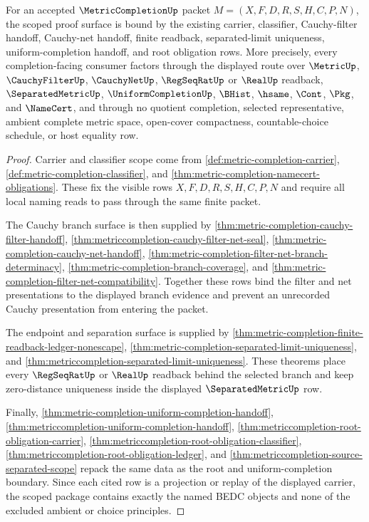 \begin{theorem}\label{thm:metriccompletion-scoped-dependency-package}
For an accepted $\MetricCompletionUp$ packet $M=(X,F,D,R,S,H,C,P,N)$, the scoped proof surface is bound by the existing carrier, classifier, Cauchy-filter handoff, Cauchy-net handoff, finite readback, separated-limit uniqueness, uniform-completion handoff, and root obligation rows. More precisely, every completion-facing consumer factors through the displayed route over $\MetricUp$, $\CauchyFilterUp$, $\CauchyNetUp$, $\RegSeqRatUp$ or $\RealUp$ readback, $\SeparatedMetricUp$, $\UniformCompletionUp$, $\BHist$, $\hsame$, $\Cont$, $\Pkg$, and $\NameCert$, and through no quotient completion, selected representative, ambient complete metric space, open-cover compactness, countable-choice schedule, or host equality row.
\end{theorem}
\begin{proof}
Carrier and classifier scope come from \autoref{def:metric-completion-carrier}, \autoref{def:metric-completion-classifier}, and \autoref{thm:metric-completion-namecert-obligations}. These fix the visible rows $X,F,D,R,S,H,C,P,N$ and require all local naming reads to pass through the same finite packet.

The Cauchy branch surface is then supplied by \autoref{thm:metric-completion-cauchy-filter-handoff}, \autoref{thm:metriccompletion-cauchy-filter-net-seal}, \autoref{thm:metric-completion-cauchy-net-handoff}, \autoref{thm:metric-completion-filter-net-branch-determinacy}, \autoref{thm:metric-completion-branch-coverage}, and \autoref{thm:metric-completion-filter-net-compatibility}. Together these rows bind the filter and net presentations to the displayed branch evidence and prevent an unrecorded Cauchy presentation from entering the packet.

The endpoint and separation surface is supplied by \autoref{thm:metric-completion-finite-readback-ledger-nonescape}, \autoref{thm:metric-completion-separated-limit-uniqueness}, and \autoref{thm:metriccompletion-separated-limit-uniqueness}. These theorems place every $\RegSeqRatUp$ or $\RealUp$ readback behind the selected branch and keep zero-distance uniqueness inside the displayed $\SeparatedMetricUp$ row.

Finally, \autoref{thm:metric-completion-uniform-completion-handoff}, \autoref{thm:metriccompletion-uniform-completion-handoff}, \autoref{thm:metriccompletion-root-obligation-carrier}, \autoref{thm:metriccompletion-root-obligation-classifier}, \autoref{thm:metriccompletion-root-obligation-ledger}, and \autoref{thm:metriccompletion-source-separated-scope} repack the same data as the root and uniform-completion boundary. Since each cited row is a projection or replay of the displayed carrier, the scoped package contains exactly the named BEDC objects and none of the excluded ambient or choice principles.
\end{proof}

